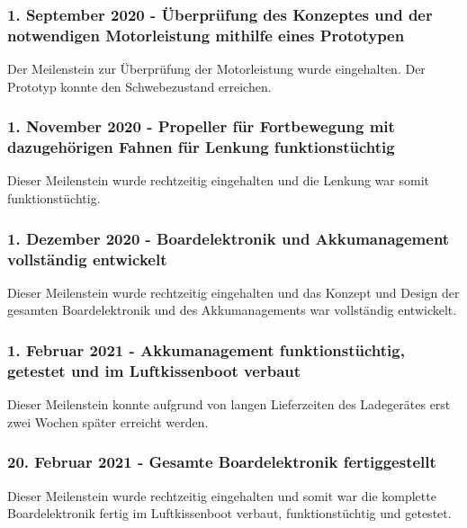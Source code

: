 
\subsubsection*{1. September 2020 - Überprüfung des Konzeptes und der notwendigen Motorleistung mithilfe eines Prototypen}
Der Meilenstein zur Überprüfung der Motorleistung wurde eingehalten. Der Prototyp konnte den Schwebezustand erreichen.

\subsubsection*{1. November 2020 - Propeller für Fortbewegung mit dazugehörigen Fahnen für Lenkung funktionstüchtig}
Dieser Meilenstein wurde rechtzeitig eingehalten und die Lenkung war somit funktionstüchtig. 

\subsubsection*{1. Dezember 2020 - Boardelektronik und  Akkumanagement vollständig entwickelt}
Dieser Meilenstein wurde rechtzeitig eingehalten und das Konzept und Design der gesamten Boardelektronik und des Akkumanagements war vollständig entwickelt. \\

\subsubsection*{1. Februar 2021 - Akkumanagement funktionstüchtig, getestet und im Luftkissenboot verbaut}
Dieser Meilenstein konnte aufgrund von langen Lieferzeiten des Ladegerätes erst zwei Wochen später erreicht werden.


\subsubsection*{20. Februar 2021 - Gesamte Boardelektronik fertiggestellt}
Dieser Meilenstein wurde rechtzeitig eingehalten und somit war die komplette Boardelektronik  fertig im Luftkissenboot verbaut, funktionstüchtig und getestet. 

